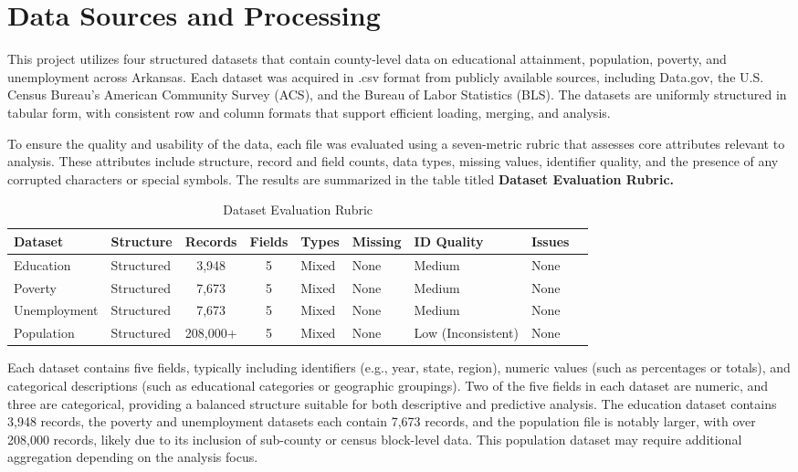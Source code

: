 \documentclass[12pt]{llncs}
\begin{document}
\section{Data Sources and Processing}
This project utilizes four structured datasets that contain county-level data on educational attainment, population, poverty, and unemployment across Arkansas. Each dataset was acquired in .csv format from publicly available sources, including Data.gov, the U.S. Census Bureau’s American Community Survey (ACS), and the Bureau of Labor Statistics (BLS). The datasets are uniformly structured in tabular form, with consistent row and column formats that support efficient loading, merging, and analysis.

To ensure the quality and usability of the data, each file was evaluated using a seven-metric rubric that assesses core attributes relevant to analysis. These attributes include structure, record and field counts, data types, missing values, identifier quality, and the presence of any corrupted characters or special symbols. The results are summarized in the table titled \textbf{Dataset Evaluation Rubric.}
\begin{table}[h!]
\centering
\caption{Dataset Evaluation Rubric}
\label{tab:rubric}
\begin{tabular}{|l|l|c|c|l|l|l|l|l|}
\hline
\textbf{Dataset} & \textbf{Structure} & \textbf{Records} & \textbf{Fields} & \textbf{Types} & \textbf{Missing} & \textbf{ID Quality} & \textbf{Issues} \\ \midrule
Education & Structured & 3,948 & 5 & Mixed & None & Medium & None\\
Poverty & Structured & 7,673 & 5 & Mixed & None& Medium & None \\
Unemployment & Structured & 7,673 & 5 & Mixed & None & Medium & None\\
Population & Structured & 208,000+ & 5 & Mixed & None & Low (Inconsistent)  & None \\
\hline
\end{tabular}
\end{table}

Each dataset contains five fields, typically including identifiers (e.g., year, state, region), numeric values (such as percentages or totals), and categorical descriptions (such as educational categories or geographic groupings). Two of the five fields in each dataset are numeric, and three are categorical, providing a balanced structure suitable for both descriptive and predictive analysis. The education dataset contains 3,948 records, the poverty and unemployment datasets each contain 7,673 records, and the population file is notably larger, with over 208,000 records, likely due to its inclusion of sub-county or census block-level data. This population dataset may require additional aggregation depending on the analysis focus.
\end{document}

